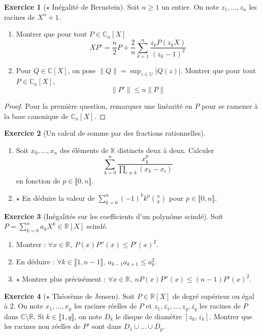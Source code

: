 \documentclass[french]{book}
\newcommand{\R}{\mathbb{R}}
\newcommand{\C}{\mathbb{C}}
\newcommand{\K}{\mathbb{K}}
\newcommand{\U}{\mathbb{U}}
\theoremstyle{definition}
\newtheorem{ex}{Exercice}[chapter]
\theoremstyle{theorem}
\theoremstyle{remark}
\begin{document}
\begin{ex}[$\star$ Inégalité de Bernstein]
	Soit $n\geqslant 1$ un entier. On note $z_1,\ldots,z_n$ les racines de $X^n+1$.
	\begin{enumerate}
		\item Montrer que pour tout $P\in\C_n[X]$ $$XP'=\frac{n}{2}P+\frac{2}{n}\sum_{k=1}^{n}\frac{z_kP(z_kX)}{(z_k-1)^2}$$
		\item Pour $Q\in\C[X]$, on pose $\lVert Q\rVert=\displaystyle\sup_{z\in\U}\lvert Q(z)\rvert$. Montrer que pour tout $P\in\C_n[X]$, $$\lVert P'\rVert\leqslant n\lVert P\rVert$$
	\end{enumerate}
\end{ex}

\begin{proof}
	Pour la première question, remarquer une linéarité en $P$ pour se ramener à la base canonique de $\C_n[X]$.
\end{proof}

\begin{ex}[Un calcul de somme par des fractions rationnelles]
	\begin{enumerate}
		\item Soit $x_0,\ldots,x_n$ des éléments de $\K$ distincts deux à deux. Calculer $$\sum_{k=0}^{n}\frac{x_k^p}{\prod_{i\ne k}(x_k-x_i)}$$ en fonction de $p\in\llbracket0,n\rrbracket$.
		\item $\star$ En déduire la valeur de $\displaystyle\sum_{k=0}^{n}(-1)^kk^p\binom{n}{k}$ pour $p\in\llbracket0,n\rrbracket$.
	\end{enumerate}
\end{ex}

\begin{ex}[Inégalités sur les coefficients d'un polynôme scindé]
	Soit $P=\displaystyle\sum_{k=0}^{n}a_kX^k\in\R[X]$ scindé.
	\begin{enumerate}
		\item Montrer : $\forall x\in\R,\ P(x)P''(x)\leqslant P'(x)^2$.
		\item En déduire : $\forall k\in\llbracket1,n-1\rrbracket,\ a_{k-1}a_{k+1}\leqslant a_k^2$.
		\item $\star$ Montrer plus précisément : $\forall x\in\R,\ nP(x)P''(x)\leqslant(n-1)P'(x)^2$.
	\end{enumerate}
\end{ex}

\begin{ex}[$\star$ Théorème de Jensen]
	Soit $P\in\R[X]$ de degré supérieur ou égal à $2$. On note $x_1,\ldots,x_p$ les racines réelles de $P$ et $z_1,\overline{z_1},\ldots,z_q,\overline{z_q}$ les racines de $P$ dans $\C\setminus\R$. Si $k\in\llbracket 1,q\rrbracket$, on note $D_k$ le disque de diamètre $[z_k,\overline{z_k}]$. Montrer que les racines non réelles de $P'$ sont dans $D_1\cup\ldots\cup D_p$.
\end{ex}
\end{document}

